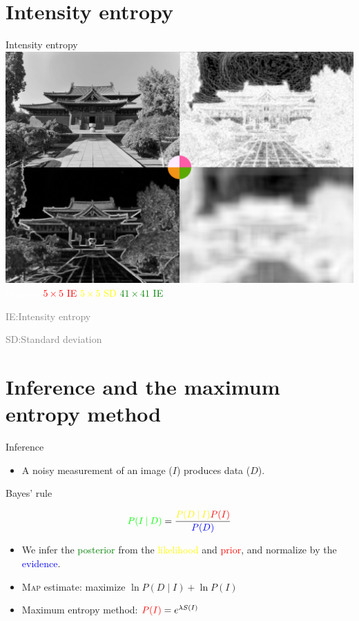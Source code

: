 \documentclass[14pt,c]{beamer}
\begin{document}
\section{Intensity entropy}

\begin{frame}{Intensity entropy}
  \centering
  \includegraphics[width=0.75\framewidth]{intensity_entropy}
  \\
  \textcolor{white}{Original}\;
  \textcolor{red}{$5\times5$ IE}\;
  \textcolor{yellow}{$5\times5$ SD}\;
  \textcolor{green}{$41\times41$ IE}

  \small
  \textcolor{gray}{IE:\@ Intensity entropy}

  \textcolor{gray}{SD:\@ Standard deviation}
\end{frame}

\section{Inference and the maximum entropy method}

\begin{frame}{Inference}
  \begin{itemize}
    \item A noisy measurement of an image ($I$) produces data ($D$).
  \end{itemize}
  \centerline{Bayes' rule}
  \[
    \textcolor{green}{P(I \mathbin{|} D)}
    = \frac{\textcolor{yellow}{P(D \mathbin{|} I)}
      \textcolor{red}{%
    P(I)}}{\textcolor{blue}{P(D)}}
  \]
  \begin{itemize}
    \item We infer the \textcolor{green}{posterior} from the
      \textcolor{yellow}{likelihood} and \textcolor{red}{prior}, and
      normalize by the \textcolor{blue}{evidence}.
    \item \textsc{Map} estimate: maximize $\ln P(D \mathbin{|} I) + \ln
      P(I)$
    \item Maximum entropy method: $\textcolor{red}{P(I)} =
      e^{\lambda S(I)}$
  \end{itemize}
\end{frame}
\end{document}
